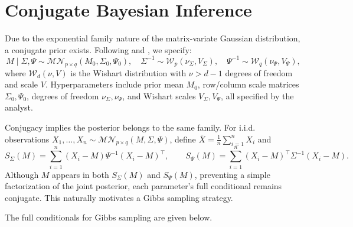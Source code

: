 \documentclass[twoside]{article}
\begin{document}
\section{Conjugate Bayesian Inference}
\label{sec:prior}
Due to the exponential family nature of the matrix-variate Gaussian distribution, a conjugate prior exists. Following \cite{Dawid1981} and \cite{Brown1993}, we specify:
\begin{equation}
M \mid \Sigma, \Psi \sim \mathcal{MN}_{p \times q}(M_0, \Sigma_0, \Psi_0), \quad 
\Sigma^{-1} \sim \mathcal{W}_p(\nu_\Sigma, V_\Sigma), \quad 
\Psi^{-1} \sim \mathcal{W}_q(\nu_\Psi, V_\Psi), \label{eq:conj_prior}
\end{equation}
where $\mathcal{W}_d(\nu, V)$ is the Wishart distribution with $\nu > d-1$ degrees of freedom and scale $V$. Hyperparameters include prior mean $M_0$, row/column scale matrices $\Sigma_0, \Psi_0$, degrees of freedom $\nu_\Sigma, \nu_\Psi$, and Wishart scales $V_\Sigma, V_\Psi$, all specified by the analyst.

Conjugacy implies the posterior belongs to the same family. For i.i.d. observations $X_1, \ldots, X_n \sim \mathcal{MN}_{p \times q}(M, \Sigma, \Psi)$, define $\bar{X} = \frac{1}{n} \sum_{i=1}^n X_i$ and
\begin{equation*}
S_{\Sigma}(M) = \sum_{i=1}^n (X_i - M) \Psi^{-1} (X_i - M)^\top, \qquad 
S_{\Psi}(M) = \sum_{i=1}^n (X_i - M)^\top \Sigma^{-1} (X_i - M).
\end{equation*}
Although $M$ appears in both $S_{\Sigma}(M)$ and $S_{\Psi}(M)$, preventing a simple factorization of the joint posterior, each parameter's full conditional remains conjugate. This naturally motivates a Gibbs sampling strategy.

\noindent The full conditionals for Gibbs sampling are given below.
\end{document}
